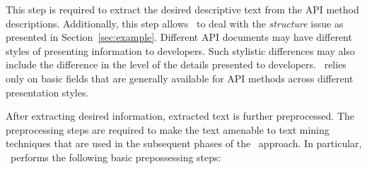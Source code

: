 This step is required to extract the desired descriptive text from the API method descriptions.
Additionally, this step allows \tool\ to deal with the \textit{structure} issue as presented in Section~\ref{sec:example}.
Different API documents may have different styles of presenting information to developers.
Such stylistic differences may also include the difference in the level of the details presented to developers.
\tool\ relies only on basic fields that are generally available for API methods across different presentation styles. 

After extracting desired information, extracted text is further preprocessed.
The preprocessing steps are required to make the text amenable to text mining techniques
that are used in the subsequent phases of the \tool\ approach.
In particular, \tool\ performs the following basic prepossessing steps: 

